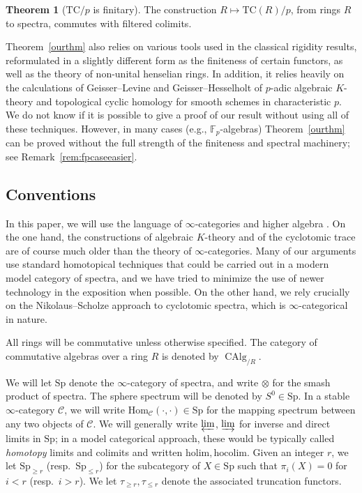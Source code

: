 \documentclass{amsart}
\newcommand{\Sp}{\mathrm{Sp}}
\theoremstyle{definition}
\newtheorem{thm}{Theorem}
\newcommand{\op}{\operatorname}
\newcommand{\TC}{\mathrm{TC}}
\begin{document}
\begin{thm}[$\TC/p$ is finitary]
The construction $R \mapsto \TC(R)/p$, from rings $R$ to spectra, commutes with
filtered colimits. 
\end{thm}




Theorem~\ref{ourthm} also relies on various tools used in the classical rigidity results, reformulated in a slightly different
form as the finiteness of certain functors, as well as the theory of
non-unital henselian rings. 
In addition, it relies heavily on the calculations of Geisser--Levine
\cite{GH} and Geisser--Hesselholt \cite{GH} of $p$-adic algebraic $K$-theory and
topological cyclic homology for smooth schemes in characteristic $p$. 
We do not know if it is possible to give a proof of our result 
without using all of these techniques. 
However, in many cases (e.g., $\mathbb{F}_p$-algebras) Theorem~\ref{ourthm}
can be proved without
the full strength of the finiteness and spectral machinery; see Remark~\ref{rem:fpcaseeasier}. 



\subsection*{Conventions}
In this paper, we will use the language of $\infty$-categories
and higher algebra
\cite{HTT, HA}. On the one hand, the constructions of algebraic $K$-theory and of
the cyclotomic trace are of course much older than the theory of $\infty$-categories. Many of
our arguments use standard homotopical techniques that could be carried out
in a modern model category of spectra, and we  have tried to minimize the use of
newer technology in the exposition when possible. On the other hand, we rely crucially
on the Nikolaus--Scholze \cite{nikolaus-scholze} approach to cyclotomic spectra,
which is $\infty$-categorical in nature.  

All rings will be commutative unless otherwise specified. The category of commutative algebras over a ring $R$ is denoted by $\op{CAlg}_{/R}$.

We will let $\Sp$ denote the $\infty$-category of spectra, and write $\otimes$
for the smash product of spectra. The sphere spectrum will be denoted by $S^0\in\Sp$. 
In a stable $\infty$-category $\mathcal{C}$, we will write
$\mathrm{Hom}_{\mathcal{C}}(\cdot, \cdot) \in \Sp$ for the mapping spectrum between any
two objects of $\mathcal{C}$.
We will generally write $\varprojlim$, $\varinjlim$ for inverse and direct limits
in $\Sp$; in a model categorical approach, these would be typically called
\emph{homotopy} limits and colimits and written $\mathrm{holim},
\mathrm{hocolim}$. Given an integer $r$, we let $\Sp_{\geq r}$ (resp.~$\Sp_{\leq r}$) for the
subcategory of $X \in\Sp$ such that $\pi_i(X) = 0$ for $i < r$ (resp.~$i>r$). 
We let 
$\tau_{\geq r}, \tau_{\leq r}$ denote the associated truncation functors. 
\end{document}
